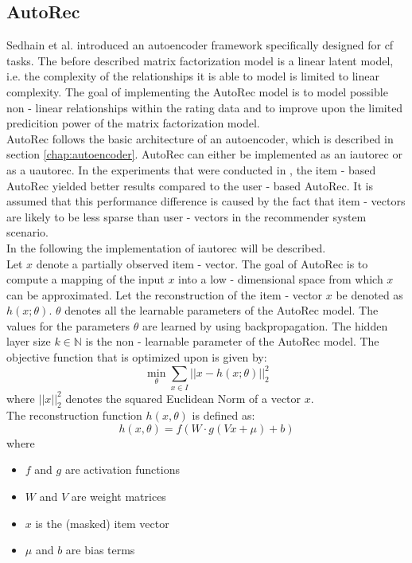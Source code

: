 \subsection{AutoRec}
Sedhain et al. \cite{sedhain2015autorec} introduced an autoencoder framework specifically designed for \acrshort{cf} tasks.
The before described matrix factorization model is a linear latent model, i.e. the complexity of the relationships it is able to model is limited to linear complexity. The goal of implementing the AutoRec model is to model possible non - linear relationships within the rating data and to improve upon the limited predicition power of the matrix factorization model.\\
AutoRec follows the basic architecture of an autoencoder, which is described in section \ref{chap:autoencoder}. AutoRec can either be implemented as an \acrfull{iautorec} or as a \acrfull{uautorec}. In the experiments that were conducted in \cite{sedhain2015autorec}, the item - based AutoRec yielded better results compared to the user - based AutoRec. It is assumed that this performance difference is caused by the fact that item - vectors are likely to be less sparse than user - vectors in the recommender system scenario.\\
In the following the implementation of \acrshort{iautorec} will be described.\\
Let $x$ denote a partially observed item - vector. The goal of AutoRec is to compute a mapping of the input $x$ into a low - dimensional space from which $x$ can be approximated. Let the reconstruction of the item - vector $x$ be denoted as $h(x;\theta)$. $\theta$ denotes all the learnable parameters of the AutoRec model. The values for the parameters $\theta$ are learned by using backpropagation. The hidden layer size $k \in \mathbb{N}$ is the non - learnable parameter of the AutoRec model. The objective function that is optimized upon is given by:
\begin{equation}
    \min_{\theta}\sum_{x \in I} ||x - h(x; \theta)||^{2}_{2}
\end{equation}
where $||x||_{2}^{2}$ denotes the squared Euclidean Norm of a vector $x$.\\
The reconstruction function $h(x, \theta)$ is defined as:\\
\begin{equation}
    h(x,\theta) = f(W \cdot g(Vx + \mu) + b)
\end{equation}
where\\
\begin{itemize}
    \item $f$ and $g$ are activation functions
    \item $W$ and $V$ are weight matrices
    \item $x$ is the (masked) item vector
    \item $\mu$ and $b$ are bias terms
\end{itemize}
